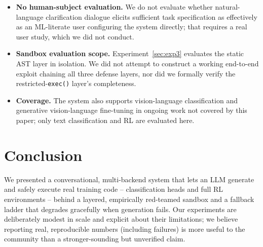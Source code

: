 \documentclass[10pt,twocolumn]{article}
\begin{document}
\begin{itemize}
        truncated mid-JSON under load. We discarded it (kept in the code
        repository, under a directory suffixed \texttt{\_CONTENDED\_} \texttt{DISCARDED},
        for audit purposes) and re-ran Experiment~\ref{sec:exp4} alone; the
        numbers reported in Table~\ref{tab:exp4} are from the
        uncontended re-run only. We flag this because it is a concrete
        example of how easy it is for infrastructure-level contention to
        masquerade as a model-level finding if results are not
        cross-checked against the conditions they were collected under.
  \item \textbf{No human-subject evaluation.} We do not evaluate whether
        natural-language clarification dialogue elicits sufficient task
        specification as effectively as an ML-literate user configuring
        the system directly; that requires a real user study, which we did
        not conduct.
  \item \textbf{Sandbox evaluation scope.} Experiment~\ref{sec:exp3}
        evaluates the static AST layer in isolation. We did not attempt to
        construct a working end-to-end exploit chaining all three defense
        layers, nor did we formally verify the restricted-\texttt{exec()}
        layer's completeness.
  \item \textbf{Coverage.} The system also supports vision-language
        classification and generative vision-language fine-tuning in
        ongoing work not covered by this paper; only text classification
        and RL are evaluated here.
\end{itemize}

\section{Conclusion}
We presented a conversational, multi-backend system that lets an LLM
generate and safely execute real training code -- classification heads and
full RL environments -- behind a layered, empirically red-teamed sandbox
and a fallback ladder that degrades gracefully when generation fails. Our
experiments are deliberately modest in scale and explicit about their
limitations; we believe reporting real, reproducible numbers (including
failures) is more useful to the community than a stronger-sounding but
unverified claim.
\end{document}
